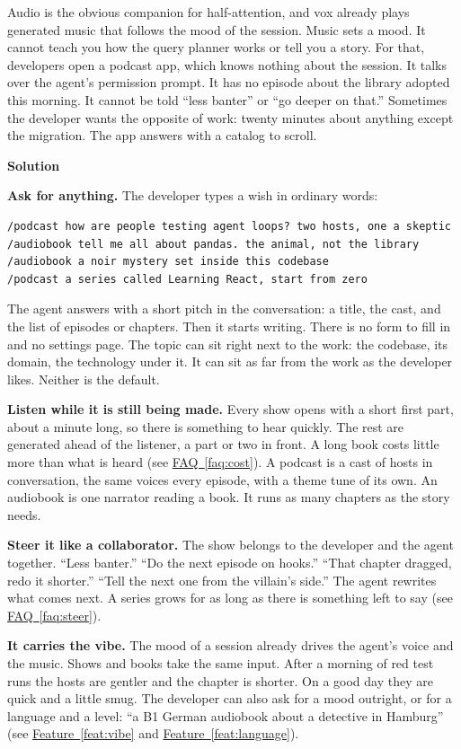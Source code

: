 \documentclass[11pt,letterpaper]{article} %
\newcommand{\prsection}[1]{%
  \vspace{1em}%
  {\large\bfseries\color{SectionBlue}#1}%
  \vspace{0.3em}\par%
}
\newcommand{\faqref}[1]{\hyperref[#1]{FAQ~\ref*{#1}}}
\newcommand{\featureref}[1]{\hyperref[#1]{Feature~\ref*{#1}}}
\begin{document}
Audio is the obvious companion for half-attention, and vox already plays
generated music that follows the mood of the session. Music sets a mood. It
cannot teach you how the query planner works or tell you a story. For that,
developers open a podcast app, which knows nothing about the session. It
talks over the agent's permission prompt. It has no episode about the
library adopted this morning. It cannot be told ``less banter'' or ``go
deeper on that.'' Sometimes the developer wants the opposite of work:
twenty minutes about anything except the migration. The app answers with a
catalog to scroll.

\prsection{Solution}

\textbf{Ask for anything.} The developer types a wish in ordinary words:

{\small\begin{verbatim}
/podcast how are people testing agent loops? two hosts, one a skeptic
/audiobook tell me all about pandas. the animal, not the library
/audiobook a noir mystery set inside this codebase
/podcast a series called Learning React, start from zero
\end{verbatim}}

The agent answers with a short pitch in the conversation: a title, the cast,
and the list of episodes or chapters. Then it starts writing. There is no
form to fill in and no settings page. The topic can sit right next to the
work: the codebase, its domain, the technology under it. It can sit as far
from the work as the developer likes. Neither is the default.

\textbf{Listen while it is still being made.} Every show opens with a short
first part, about a minute long, so there is something to hear quickly. The
rest are generated ahead of the listener, a part or two in front. A long
book costs little more than what is heard (see \faqref{faq:cost}). A
podcast is a cast of hosts in conversation, the same voices every episode,
with a theme tune of its own. An audiobook is one narrator reading a book.
It runs as many chapters as the story needs.

\textbf{Steer it like a collaborator.} The show belongs to the developer and
the agent together. ``Less banter.'' ``Do the next episode on hooks.''
``That chapter dragged, redo it shorter.'' ``Tell the next one from the
villain's side.'' The agent rewrites what comes next. A series grows for
as long as there is something left to say (see \faqref{faq:steer}).

\textbf{It carries the vibe.} The mood of a session already drives the
agent's voice and the music. Shows and books take the same input. After a
morning of red test runs the hosts are gentler and the chapter is shorter.
On a good day they are quick and a little smug. The developer can also ask
for a mood outright, or for a language and a level: ``a B1 German audiobook
about a detective in Hamburg'' (see \featureref{feat:vibe} and
\featureref{feat:language}).
\end{document}
